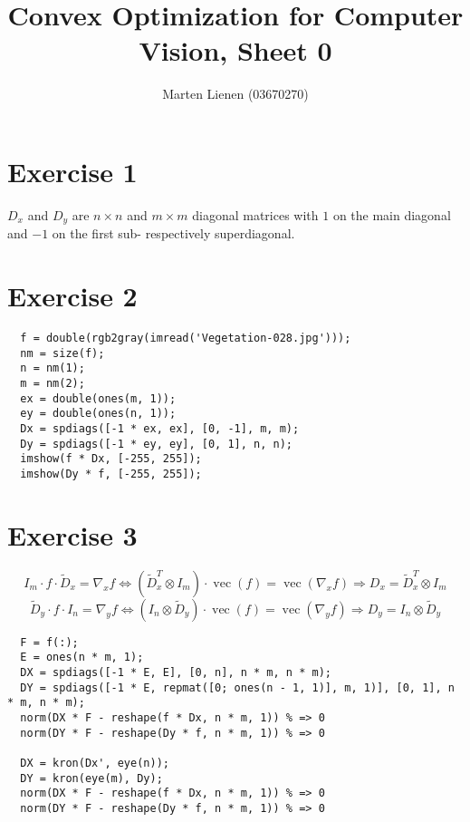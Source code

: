 \documentclass[10pt,a4paper]{article}
\title{Convex Optimization for Computer Vision, Sheet 0}
\author{Marten Lienen (03670270)}
\DeclareMathOperator{\tovec}{vec}
\begin{document}
\maketitle

\section*{Exercise 1}

$D_{x}$ and $D_{y}$ are $n \times n$ and $m \times m$ diagonal matrices with $1$ on the main diagonal and $-1$ on the first sub- respectively superdiagonal.

\section*{Exercise 2}

\begin{verbatim}
  f = double(rgb2gray(imread('Vegetation-028.jpg')));
  nm = size(f);
  n = nm(1);
  m = nm(2);
  ex = double(ones(m, 1));
  ey = double(ones(n, 1));
  Dx = spdiags([-1 * ex, ex], [0, -1], m, m);
  Dy = spdiags([-1 * ey, ey], [0, 1], n, n);
  imshow(f * Dx, [-255, 255]);
  imshow(Dy * f, [-255, 255]);
\end{verbatim}

\section*{Exercise 3}

\begin{equation*}
  I_{m} \cdot f \cdot \widetilde{D}_{x} = \nabla_{x} f \Leftrightarrow (\widetilde{D}_{x}^{T} \otimes I_{m}) \cdot \tovec(f) = \tovec(\nabla_{x} f) \Rightarrow D_{x} = \widetilde{D}_{x}^{T} \otimes I_{m}
\end{equation*}
\begin{equation*}
  \widetilde{D}_{y} \cdot f \cdot I_{n} = \nabla_{y} f \Leftrightarrow (I_{n} \otimes \widetilde{D}_{y}) \cdot \tovec(f) = \tovec(\nabla_{y} f) \Rightarrow D_{y} = I_{n} \otimes \widetilde{D}_{y}
\end{equation*}

\begin{verbatim}
  F = f(:);
  E = ones(n * m, 1);
  DX = spdiags([-1 * E, E], [0, n], n * m, n * m);
  DY = spdiags([-1 * E, repmat([0; ones(n - 1, 1)], m, 1)], [0, 1], n * m, n * m);
  norm(DX * F - reshape(f * Dx, n * m, 1)) % => 0
  norm(DY * F - reshape(Dy * f, n * m, 1)) % => 0

  DX = kron(Dx', eye(n));
  DY = kron(eye(m), Dy);
  norm(DX * F - reshape(f * Dx, n * m, 1)) % => 0
  norm(DY * F - reshape(Dy * f, n * m, 1)) % => 0
\end{verbatim}
\end{document}

